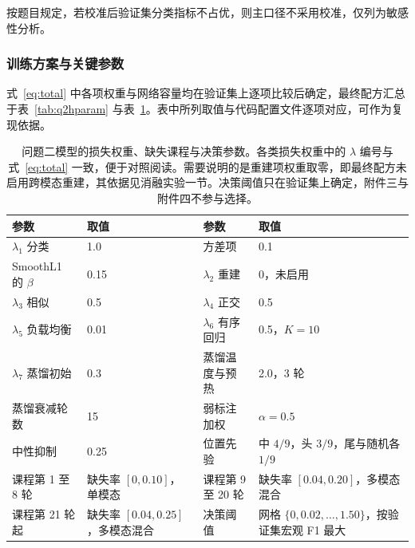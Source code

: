 \documentclass[withoutpreface,bwprint]{cumcmthesis}
\begin{document}
按题目规定，若校准后验证集分类指标不占优，则主口径不采用校准，仅列为敏感性分析。

\subsubsection{训练方案与关键参数}

式~\eqref{eq:total} 中各项权重与网络容量均在验证集上逐项比较后确定，最终配方汇总于表~\ref{tab:q2hparam}
与表~\ref{tab:q2hparam2}。表中所列取值与代码配置文件逐项对应，可作为复现依据。


\begin{table}[H]
\centering
  \caption{问题二模型的损失权重、缺失课程与决策参数。各类损失权重中的 $\lambda$ 编号与式~\eqref{eq:total} 一致，便于对照阅读。需要说明的是重建项权重取零，即最终配方未启用跨模态重建，其依据见消融实验一节。决策阈值只在验证集上确定，附件三与附件四不参与选择。}
\label{tab:q2hparam2}
\small
\begin{tabular}{@{}p{2.85cm}p{3.75cm}p{3.05cm}p{4.65cm}@{}}
\toprule
参数 & 取值 & 参数 & 取值 \\
\midrule
$\lambda_1$ 分类 & 1.0 & 方差项 & 0.1 \\
SmoothL1 的 $\beta$ & 0.15 & $\lambda_2$ 重建 & 0，未启用 \\
$\lambda_3$ 相似 & 0.5 & $\lambda_4$ 正交 & 0.5 \\
$\lambda_5$ 负载均衡 & 0.01 & $\lambda_6$ 有序回归 & 0.5，$K=10$ \\
$\lambda_7$ 蒸馏初始 & 0.3 & 蒸馏温度与预热 & 2.0，3 轮 \\
蒸馏衰减轮数 & 15 & 弱标注加权 & $\alpha=0.5$ \\
中性抑制 & 0.25 & 位置先验 & 中 $4/9$，头 $3/9$，尾与随机各 $1/9$ \\
课程第 1 至 8 轮 & 缺失率 $[0,0.10]$，单模态 & 课程第 9 至 20 轮 & 缺失率 $[0.04,0.20]$，多模态混合 \\
课程第 21 轮起 & 缺失率 $[0.04,0.25]$，多模态混合 & 决策阈值 & 网格 $\{0,0.02,\dots,1.50\}$，按验证集宏观 F1 最大 \\
\bottomrule
\end{tabular}
\end{table}
\end{document}
